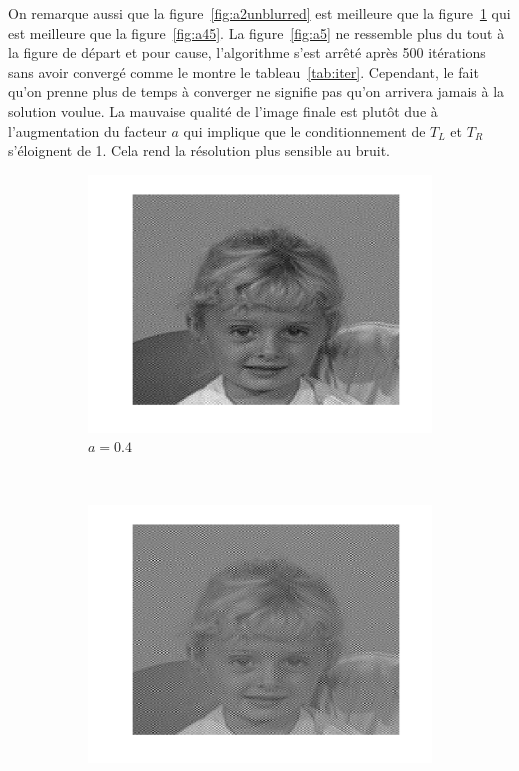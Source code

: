 On remarque aussi que
la figure~\ref{fig:a2unblurred} est meilleure que la figure~\ref{fig:a4} qui est meilleure
que la figure~\ref{fig:a45}.
La figure~\ref{fig:a5} ne ressemble plus du tout à la figure de départ et pour cause,
l'algorithme s'est arrêté après 500 itérations sans avoir convergé comme le montre
le tableau~\ref{tab:iter}.
Cependant, le fait qu'on prenne plus de temps à converger ne signifie pas qu'on arrivera
jamais à la solution voulue.
La mauvaise qualité de l'image finale est plutôt due à l'augmentation du facteur $a$ qui implique que le conditionnement de $T_L$
et $T_R$ s'éloignent de 1. Cela rend la résolution plus sensible au bruit.

\begin{figure}
  \centering
  \begin{subfigure}[b]{0.3\textwidth}
    \includegraphics[width=\textwidth]{Q2/unblurred_40.png}
    \caption{$a = 0.4$}
    \label{fig:a4}
  \end{subfigure}%
  ~ %
  \begin{subfigure}[b]{0.3\textwidth}
    \includegraphics[width=\textwidth]{Q2/unblurred_45.png}

\end{subfigure}
\end{figure}
